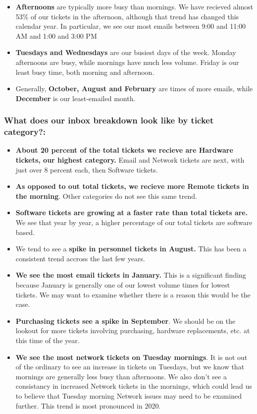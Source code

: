 \documentclass[11pt]{article}
\begin{document}
\begin{itemize}
\item
  \textbf{Afternoons} are typically more busy than mornings. We have
  recieved almost 53\% of our tickets in the afternoon, although that
  trend has changed this calendar year. In particular, we see our most
  emails between 9:00 and 11:00 AM and 1:00 and 3:00 PM
\item
  \textbf{Tuesdays and Wednesdays} are our busiest days of the week.
  Monday afternoons are busy, while mornings have much less volume.
  Friday is our least busy time, both morning and afternoon.
\item
  Generally, \textbf{October, August and February} are times of more
  emails, while \textbf{December} is our least-emailed month.
\end{itemize}

\hypertarget{what-does-our-inbox-breakdown-look-like-by-ticket-category}{%
\subsubsection{What does our inbox breakdown look like by ticket
category?:}\label{what-does-our-inbox-breakdown-look-like-by-ticket-category}}

\begin{itemize}
\item
  \textbf{About 20 percent of the total tickets we recieve are Hardware
  tickets, our highest category.} Email and Network tickets are next,
  with just over 8 percent each, then Software tickets.
\item
  \textbf{As opposed to out total tickets, we recieve more Remote
  tickets in the morning}. Other categories do not see this same trend.
\item
  \textbf{Software tickets are growing at a faster rate than total
  tickets are.} We see that year by year, a higher percentage of our
  total tickets are software based.
\item
  We tend to see a \textbf{spike in personnel tickets in August.} This
  has been a consistent trend accross the last few years.
\item
  \textbf{We see the most email tickets in January.} This is a
  significant finding because January is generally one of our lowest
  volume times for lowest tickets. We may want to examine whether there
  is a reason this would be the case.
\item
  \textbf{Purchasing tickets see a spike in September}. We should be on
  the lookout for more tickets involving purchasing, hardware
  replacements, etc. at this time of the year.
\item
  \textbf{We see the most network tickets on Tuesday mornings}. It is
  not out of the ordinary to see an increase in tickets on Tuesdays, but
  we know that mornings are generally less busy than afternoons. We also
  don't see a consistancy in increased Network tickets in the mornings,
  which could lead us to believe that Tuesday morning Network issues may
  need to be examined further. This trend is most pronounced in 2020.
\end{itemize}
\end{document}
